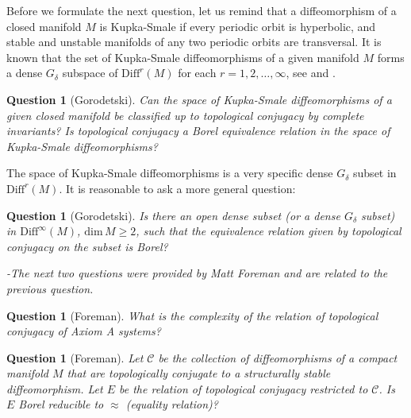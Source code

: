 \documentclass{article}
\newtheorem{question}[theorem]{Question}
\theoremstyle{definition}
\begin{document}
Before we formulate the next question, let us remind that a diffeomorphism of a closed  manifold $M$ is Kupka-Smale if every periodic orbit is hyperbolic, and stable and unstable manifolds of any two periodic orbits are transversal. It is known that the set of Kupka-Smale diffeomorphisms of a given manifold $M$ forms a dense $G_{\delta}$ subspace of $\text{Diff}^r(M)$ for each $r=1, 2, \ldots, \infty$, see \cite{Kup} and \cite{S1963}.

\vspace{5pt}

\begin{question} [Gorodetski] Can the space of Kupka-Smale diffeomorphisms of a given closed manifold be classified up to topological conjugacy by complete invariants? Is topological conjugacy a Borel equivalence relation in the space of Kupka-Smale diffeomorphisms?
\end{question}
\vspace{5pt}

The space of Kupka-Smale diffeomorphisms is a very specific dense $G_\delta$ subset in $\text{Diff}^r(M)$. It is reasonable to ask a more general question:

\vspace{5pt}

\begin{question} [Gorodetski] Is there an open dense subset (or a dense $G_{\delta}$ subset)  in $\text{Diff}^\infty(M)$, $\text{dim}\,M\ge 2$, such that the equivalence relation given by topological conjugacy on the subset is Borel?
\end{question}
 
 \textit{-The next two questions were provided by Matt Foreman and are related to the previous question.} 
 
  \begin{question} [Foreman]
      What is the complexity of the relation of topological conjugacy of Axiom A systems?
  \end{question}

 \begin{question} [Foreman] Let $\mathcal C$ be the collection of diffeomorphisms of a compact manifold $M$ that are topologically conjugate to a structurally stable diffeomorphism.  Let $E$ be the relation of topological conjugacy restricted to $\mathcal C$.  Is $E$ Borel reducible to $\approx$ (equality relation)? 
  \end{question}
\end{document}
